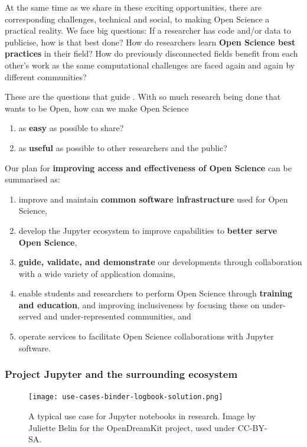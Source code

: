 At the same time as we share in these exciting opportunities, there
are corresponding challenges, technical and social, to making Open
Science a practical reality.  We face big questions: If a researcher
has code and/or data to publicise, how is that best done?  How do
researchers learn \textbf{Open Science best practices} in their field?  How do
previously disconnected fields benefit from each other's work as the
same computational challenges are faced again and again by different
communities?

These are the questions that guide \TheProject.
With so much research being done that wants to be Open,
how can we make Open Science

\begin{enumerate}
    \item as \textbf{easy} as possible to share?
    \item as \textbf{useful} as possible to other researchers and the public?
\end{enumerate}

\noindent Our plan for \textbf{improving access and effectiveness of Open Science} can be summarised as:

\begin{enumerate}
\item improve and maintain \textbf{common software infrastructure} used for
  Open Science,
\item develop the Jupyter ecosystem to improve capabilities to \textbf{better
  serve Open Science},
\item \textbf{guide, validate, and demonstrate} our developments through
  collaboration with a wide variety of application domains,
\item enable students and researchers to perform Open Science through
  \textbf{training and education}, and improving inclusiveness by focusing
  these on under-served and under-represented communities, and
\item operate services to facilitate Open Science collaborations with
  Jupyter software.
\end{enumerate}

\medskip

\subsubsection{Project Jupyter and the surrounding ecosystem}
\label{sec:project-jupyter}

\begin{figure}[htb]\centering
  \texttt{[image: use-cases-binder-logbook-solution.png]}
  \caption{A typical use case for Jupyter notebooks in research.
            Image by Juliette Belin for the OpenDreamKit project, used under
            CC-BY-SA.}\label{fig:use-cases-binder}
\end{figure}

